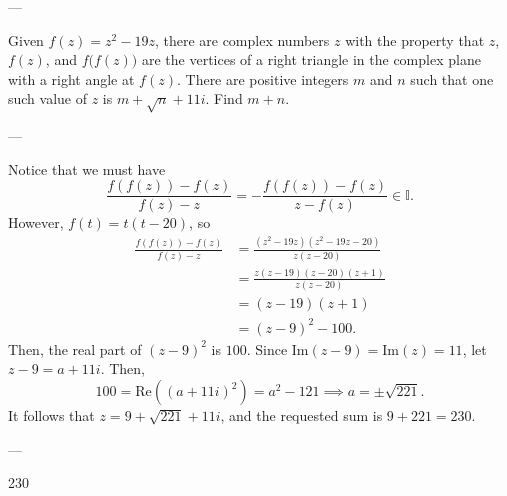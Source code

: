 
---

Given $f(z)=z^2-19z$, there are complex numbers $z$ with the property that $z$, $f(z)$, and $f\big(f(z)\big)$ are the vertices of a right triangle in the complex plane with a right angle at $f(z)$. There are positive integers $m$ and $n$ such that one such value of $z$ is $m+\sqrt n+11i$. Find $m+n$.

---

Notice that we must have \[\frac{f(f(z))-f(z)}{f(z)-z}=-\frac{f(f(z))-f(z)}{z-f(z)}\in\mathbb I.\]
However, $f(t)=t(t-20)$, so
\begin{align*}
    \frac{f(f(z))-f(z)}{f(z)-z}&=\frac{(z^2-19z)(z^2-19z-20)}{z(z-20)}\\
    &=\frac{z(z-19)(z-20)(z+1)}{z(z-20)}\\
    &=(z-19)(z+1)\\
    &=(z-9)^2-100.
\end{align*}
Then, the real part of $(z-9)^2$ is $100$. Since $\text{Im}(z-9)=\text{Im}(z)=11$, let $z-9=a+11i$. Then, \[100=\text{Re}((a+11i)^2)=a^2-121\implies a=\pm\sqrt{221}.\]
It follows that $z=9+\sqrt{221}+11i$, and the requested sum is $9+221=230$.

---

230

